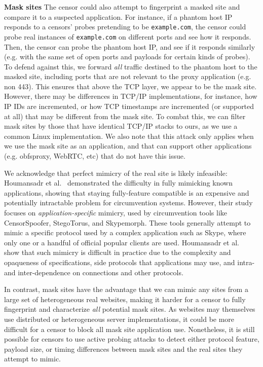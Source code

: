 \documentclass[sigconf,anonymous]{acmart}
\renewcommand{\paragraph}[1]{\smallskip\noindent\textbf{#1\quad}}
\begin{document}
\paragraph{Mask sites}
The censor could also attempt to fingerprint a masked site and compare it to a
suspected \scheme application. For instance, if a phantom host IP responds to a
censors' probes
pretending to be \texttt{example.com}, the censor could probe real instances
of \texttt{example.com} on different ports and see how it responds. Then, the
censor can probe the phantom host IP, and see if it responds similarly (e.g. with
the same set of open ports and payloads for certain kinds of probes). To defend
against this, we forward \emph{all} traffic destined to the phantom host to the
masked site, including ports that are not relevant to the proxy application
(e.g. non 443). This ensures that above the TCP layer, we appear to be the mask
site. However, there may be differences in TCP/IP implementations, for instance,
how IP IDs are incremented, or how TCP timestamps are incremented (or supported
at all) that may be different from the mask site. To combat this, we can filter
mask sites by those that have identical TCP/IP stacks to ours, as we use a
common Linux implementation. We also note that this attack only applies when we
use the mask site as an application, and that \scheme can support other
applications (e.g. obfsproxy, WebRTC, etc) that do not have this issue.

We acknowledge that perfect mimicry of the real site is likely infeasible:
Houmansadr et al.~\cite{houmansadr-parrot} demonstrated the difficulty in fully
mimicking known applications, showing that staying fully-feature compatible is
an expensive and potentially intractable problem for circumvention systems.
However, their study focuses on \emph{application-specific} mimicry, used by
circumvention tools like CensorSpoofer, StegoTorus, and Skypemorph. These tools
generally attempt to mimic a specific protocol used by a complex application
such as Skype,
where only one or a handful of official popular clients are used. Houmansadr et
al.~\cite{houmansadr-parrot} show that such mimicry is difficult in practice due
to the complexity and opaqueness of specifications, side protocols that
applications may use, and intra- and inter-dependence on connections and other
protocols.

In contrast, mask sites have
the advantage that we can mimic any sites from a large set of heterogeneous real
websites, making it harder for a censor to fully fingerprint and characterize
\emph{all} potential mask sites. As websites may themselves use distributed
or heterogeneous server implementations, it could be more difficult for a
censor to block all mask site application use.
Nonetheless, it is still possible for censors to
use active probing attacks to detect either protocol feature, payload size, or
timing differences between mask sites and the real sites they attempt to mimic.
\end{document}
